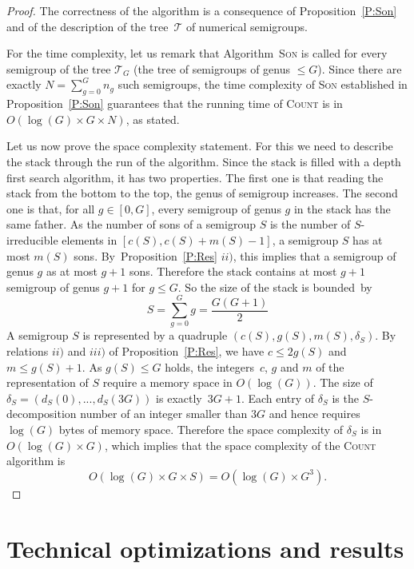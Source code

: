 \documentclass[reqno,11pt]{amsart}
\theoremstyle{plain}
\theoremstyle{definition}
\renewcommand{\leq}{\leqslant}
\begin{document}
\begin{proof}
The correctness of the algorithm is a consequence of Proposition~\ref{P:Son} and of the description of the tree~$\mathcal{T}$ of numerical semigroups.

For the time complexity, let us remark that Algorithm~\textsc{Son} is called for every semigroup of the tree $\mathcal{T}_G$ (the tree of semigroups of genus $\leq G$). 
Since there are exactly $N=\sum_{g=0}^G n_g$ such semigroups, the time complexity of \textsc{Son} established in Proposition~\ref{P:Son} guarantees that the running time of \textsc{Count} is in~$O(\log(G)\times G\times N)$, as stated.

Let us now prove the space complexity statement.
For  this we need to describe the stack through  the run of the algorithm.
Since the stack is filled  with a depth first search algorithm, it has two properties.
The first one is that reading the stack from the bottom to the top, the genus of  semigroup increases.  
The second one is that, for all $g\in[0,G]$, every semigroup of genus $g$ in the stack has the same father.
As the number of sons of a  semigroup $S$ is the number of $S$-irreducible elements in $[c(S),c(S)+m(S)-1]$,  a semigroup $S$ has at most $m(S)$ sons. 
By~Proposition~\ref{P:Res} $ii)$, this implies that a semigroup of genus $g$ as at most $g+1$ sons.
Therefore the stack contains at most $g+1$ semigroup of genus $g+1$ for $g\leq G$. 
So the size of the stack is bounded~by 
\[
S=\sum_{g=0}^Gg=\frac{G(G+1)}2
\]
A semigroup $S$ is represented by a quadruple $(c(S),g(S),m(S),\delta_S)$. 
By relations $ii)$ and $iii)$ of Proposition~\ref{P:Res}, we have $c\leq 2g(S)$ and $m\leq g(S)+1$. 
As $g(S)\leq G$ holds, the integers~$c$, $g$  and $m$ of the representation of $S$ require a memory space in $O(\log(G))$. 
The size of~$\delta_S=(d_S(0),...,d_S(3G))$ is exactly~$3G+1$. 
Each entry of $\delta_S$ is the $S$-decomposition number of an integer smaller than $3G$ and hence
requires $\log(G)$ bytes of memory space.
Therefore the space complexity of $\delta_S$ is in~$O(\log(G)\times G)$, which implies that the space complexity of the \textsc{Count} algorithm is
\[
O(\log(G)\times G\times S)= O(\log(G)\times G^3).
\]
\end{proof}

\section{Technical optimizations and results}

\label{S:Opti}
\end{document}
